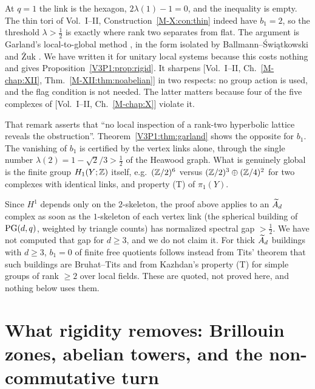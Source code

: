 \begin{remark}\label{V3P1:rem:sharp}
At $q=1$ the link is the hexagon, $2\lambda(1)-1=0$, and the inequality is empty. The thin
tori of Vol.~I--II, Construction~\ref{M-X:con:thin} indeed have $b_1=2$, so the threshold
$\lambda>\tfrac12$ is exactly where rank two separates from flat. The argument is Garland's
local-to-global method \cite{Ga}, in the form isolated by Ballmann--\'Swi\k{a}tkowski
\cite{BSw} and \.Zuk \cite{Zuk96}. We have written it for unitary local systems because this
costs nothing and gives Proposition~\ref{V3P1:prop:rigid}. It sharpens
[Vol.~I--II, Ch.~\ref{M-chap:XII}, Thm.~\ref{M-XII:thm:noabelian}] in two respects: no group action is used,
and the flag condition is not needed. The latter matters because four of the five complexes
of [Vol.~I--II, Ch.~\ref{M-chap:X}] violate it.
\end{remark}

\begin{remark}\label{V3P1:rem:physcorr}
That remark asserts that ``no local inspection of a rank-two hyperbolic lattice reveals the
obstruction''. Theorem~\ref{V3P1:thm:garland} shows the opposite for $b_1$. The vanishing of
$b_1$ is certified by the vertex links alone, through the single number
$\lambda(2)=1-\sqrt2/3>\tfrac12$ of the Heawood graph. What is genuinely global is the finite
group $H_1(Y;\mathbb{Z})$ itself, e.g.\ $(\mathbb{Z}/2)^{6}$ versus $(\mathbb{Z}/2)^{3}\oplus(\mathbb{Z}/4)^{2}$ for two
complexes with identical links, and property (T) of $\pi_1(Y)$.
\end{remark}

\begin{remark}[$\Atilde d$, $d\ge3$]\label{V3P1:rem:Ad}
Since $H^{1}$ depends only on the $2$-skeleton, the proof above applies to an $\Atilde d$
complex as soon as the $1$-skeleton of each vertex link (the spherical building of $\mathrm{PG}(d,q)$,
weighted by triangle counts) has normalized spectral gap $>\tfrac12$. We have not computed that
gap for $d\ge3$, and we do not claim it. For thick $\Atilde d$ buildings with $d\ge3$,
$b_1=0$ of finite free quotients follows instead from Tits' theorem that such buildings are
Bruhat--Tits and from Kazhdan's property (T) for simple groups of rank $\ge2$ over local
fields. These are quoted, not proved here, and nothing below uses them.
\end{remark}

\section{What rigidity removes: Brillouin zones, abelian towers, and the non-commutative turn}\label{V3P1:sec:turn}


